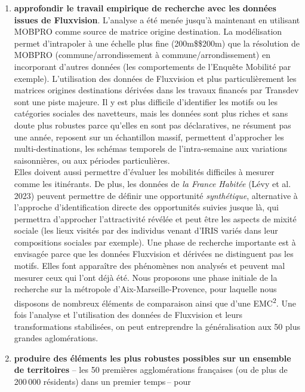 \documentclass[
  french,
  9pt,
  a4paper,
  DIV=11,
  twoside=semi]{scrreprt}
\begin{document}
\begin{enumerate}
\def\labelenumi{\arabic{enumi}.}
\item
  \textbf{approfondir le travail empirique de recherche avec les données
  issues de Fluxvision}. L'analyse a été menée jusqu'à maintenant en
  utilisant MOBPRO comme source de matrice origine destination. La
  modélisation permet d'intrapoler à une échelle plus fine
  (200m\$\times\$200m) que la résolution de MOBPRO
  (commune/arrondissement à commune/arrondissement) en incorporant
  d'autres données (les comportements de l'Enquête Mobilité par
  exemple). L'utilisation des données de Fluxvision et plus
  particulièrement les matrices origines destinations dérivées dans les
  travaux financés par Transdev sont une piste majeure. Il y est plus
  difficile d'identifier les motifs ou les catégories sociales des
  navetteurs, mais les données sont plus riches et sans doute plus
  robustes parce qu'elles en sont pas déclaratives, ne résument pas une
  année, reposent sur un échantillon massif, permettent d'approcher les
  multi-destinations, les schémas temporels de l'intra-semaine aux
  variations saisonnières, ou aux périodes particulières.\\
  Elles doivent aussi permettre d'évaluer les mobilités difficiles à
  mesurer comme les itinérants. De plus, les données de \emph{la France
  Habitée} (Lévy et al. 2023) peuvent permettre de définir une
  opportunité \emph{synthétique}, alternative à l'approche
  d'identification directe des opportunités suivies jusque là, qui
  permettra d'approcher l'attractivité révélée et peut être les aspects
  de mixité sociale (les lieux visités par des individus venant d'IRIS
  variés dans leur compositions sociales par exemple). Une phase de
  recherche importante est à envisagée parce que les données Fluxvision
  et dérivées ne distinguent pas les motifs. Elles font apparaître des
  phénomènes non analysés et peuvent mal mesurer ceux qui l'ont déjà
  été. Nous proposons une phase initiale de la recherche sur la
  métropole d'Aix-Marseille-Provence, pour laquelle nous disposons de
  nombreux éléments de comparaison ainsi que d'une
  EMC\textsuperscript{2}. Une fois l'analyse et l'utilisation des
  données de Fluxvision et leurs transformations stabilisées, on peut
  entreprendre la généralisation aux 50 plus grandes aglomérations.
\item
  \textbf{produire des éléments les plus robustes possibles sur un
  ensemble de territoires} -- les 50 premières agglomérations françaises
  (ou de plus de 200\,000 résidents) dans un premier temps\,-- pour

\end{enumerate}
\end{document}
